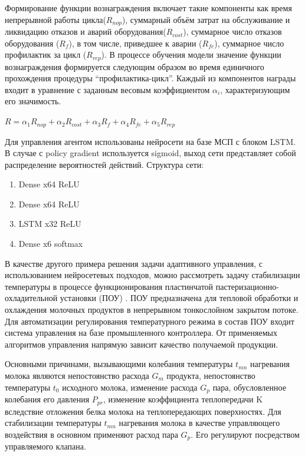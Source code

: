 Формирование функции вознаграждения включает такие компоненты как время непрерывной работы цикла($R_{nop}$), суммарный объём затрат на обслуживание и ликвидацию отказов и аварий оборудования($R_{cost}$), суммарное число отказов оборудования ($R_{f}$), в том числе, приведшее к аварии ($R_{fe}$), суммарное число профилактик за цикл ($R_{rep}$). В процессе обучения модели значение функции вознаграждения формируется следующим образом во время единичного прохождения процедуры ``профилактика-цикл''. Каждый из компонентов награды входит в уравнение с заданным весовым коэффициентом $\alpha_i$, характеризующим его значимость.


$R=\alpha_1 R_{nop}+\alpha_2 R_{cost}+\alpha_3 R_{f}+\alpha_4 R_{fe}+\alpha_5 R_{rep}$

Для управления агентом использованы нейросети на базе МСП с блоком LSTM. В случае с policy gradient используется sigmoid, выход сети представляет собой распределение вероятностей действий.
Структура сети:

\begin{enumerate}
    \item Dense x64 ReLU
    \item Dense x64 ReLU
    \item LSTM x32 ReLU
    \item Dense x6 softmax

\end{enumerate}

В качестве другого примера решения задачи адаптивного управления, с использованием нейросетевых подходов, можно рассмотреть задачу стабилизации температуры в процессе функционирования пластинчатой пастеризационно-охладительной установки (ПОУ) . ПОУ предназначена  для  тепловой  обработки  и  охлаждения  молочных продуктов  в  непрерывном  тонкослойном  закрытом  потоке. Для  автоматизации  регулирования  температурного  режима  в  состав  ПОУ входит  система  управления  на  базе  промышленного  контроллера. От  применяемых  алгоритмов  управления  напрямую  зависит  качество получаемой продукции.

Основными  причинами,  вызывающими  колебания  температуры $t_{mn}$ нагревания молока являются непостоянство расхода $G_m$ продукта, непостоянство температуры $t_0$ исходного молока, изменение расхода $G_p$  пара,  обусловленное  колебания  его  давления $P_{pr}$, изменение коэффициента теплопередачи K вследствие отложения белка молока на теплопередающих поверхностях. Для стабилизации температуры $t_{mn}$ нагревания молока в качестве управляющего воздействия в основном применяют расход пара $G_p$. Его регулируют посредством управляемого клапана.

